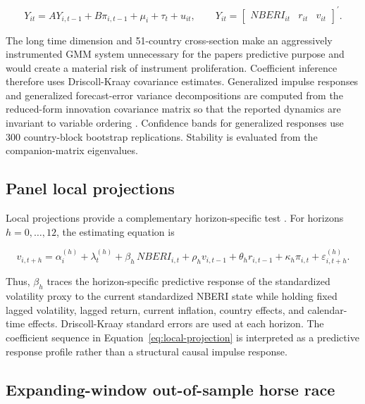 \documentclass[11pt]{article}
\begin{document}
\begin{equation}
\label{eq:pvar}
Y_{it}=A Y_{i,t-1}+B\pi_{i,t-1}+\mu_i+\tau_t+u_{it},
\qquad
Y_{it}=\begin{bmatrix}NBERI_{it}&r_{it}&v_{it}\end{bmatrix}^{\prime}.
\end{equation}

The long time dimension and 51-country cross-section make an
aggressively instrumented GMM system unnecessary for the
paper\textquotesingle s predictive purpose and would create a material
risk of instrument proliferation. Coefficient inference therefore uses
Driscoll-Kraay covariance estimates. Generalized impulse responses and
generalized forecast-error variance decompositions are computed from the
reduced-form innovation covariance matrix so that the reported dynamics
are invariant to variable ordering \citep{pesaran1998}. Confidence
bands for generalized responses use 300 country-block bootstrap
replications. Stability is evaluated from the companion-matrix
eigenvalues.

\subsection{Panel local projections}\label{panel-local-projections}

Local projections provide a complementary horizon-specific test \citep{jorda2005}. For horizons $h=0,\ldots,12$, the estimating equation is

\begin{equation}
\label{eq:local-projection}
v_{i,t+h}
=\alpha_i^{(h)}+\lambda_t^{(h)}+\beta_h\,NBERI_{i,t}
+\rho_h v_{i,t-1}+\theta_h r_{i,t-1}+\kappa_h\pi_{i,t}
+\varepsilon_{i,t+h}^{(h)}.
\end{equation}

Thus, $\beta_h$ traces the horizon-specific predictive response of the standardized volatility proxy to the current standardized NBERI state while holding fixed lagged volatility, lagged return, current inflation, country effects, and calendar-time effects. Driscoll-Kraay standard errors are used at each horizon. The coefficient sequence in Equation~\eqref{eq:local-projection} is interpreted as a predictive response profile rather than a structural causal impulse response.

\subsection{Expanding-window out-of-sample horse
race}\label{expanding-window-out-of-sample-horse-race}
\end{document}
